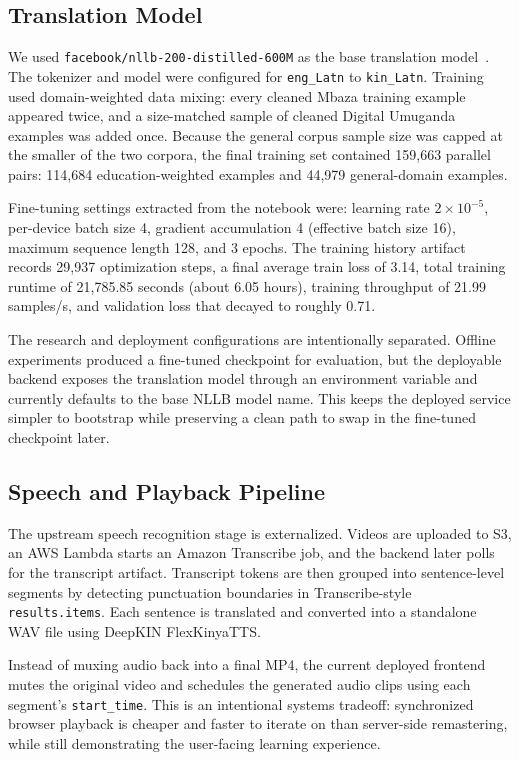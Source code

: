 \documentclass[conference]{IEEEtran}
\begin{document}
\subsection{Translation Model}
We used \texttt{facebook/nllb-200-distilled-600M} as the base translation model~\cite{nllb}. The tokenizer and model were configured for \texttt{eng\_Latn} to \texttt{kin\_Latn}. Training used domain-weighted data mixing: every cleaned Mbaza training example appeared twice, and a size-matched sample of cleaned Digital Umuganda examples was added once. Because the general corpus sample size was capped at the smaller of the two corpora, the final training set contained 159,663 parallel pairs: 114,684 education-weighted examples and 44,979 general-domain examples.

Fine-tuning settings extracted from the notebook were: learning rate $2\times10^{-5}$, per-device batch size 4, gradient accumulation 4 (effective batch size 16), maximum sequence length 128, and 3 epochs. The training history artifact records 29,937 optimization steps, a final average train loss of 3.14, total training runtime of 21,785.85 seconds (about 6.05 hours), training throughput of 21.99 samples/s, and validation loss that decayed to roughly 0.71.

The research and deployment configurations are intentionally separated. Offline experiments produced a fine-tuned checkpoint for evaluation, but the deployable backend exposes the translation model through an environment variable and currently defaults to the base NLLB model name. This keeps the deployed service simpler to bootstrap while preserving a clean path to swap in the fine-tuned checkpoint later.

\subsection{Speech and Playback Pipeline}
The upstream speech recognition stage is externalized. Videos are uploaded to S3, an AWS Lambda starts an Amazon Transcribe job, and the backend later polls for the transcript artifact. Transcript tokens are then grouped into sentence-level segments by detecting punctuation boundaries in Transcribe-style \texttt{results.items}. Each sentence is translated and converted into a standalone WAV file using DeepKIN FlexKinyaTTS.

Instead of muxing audio back into a final MP4, the current deployed frontend mutes the original video and schedules the generated audio clips using each segment's \texttt{start\_time}. This is an intentional systems tradeoff: synchronized browser playback is cheaper and faster to iterate on than server-side remastering, while still demonstrating the user-facing learning experience.
\end{document}
